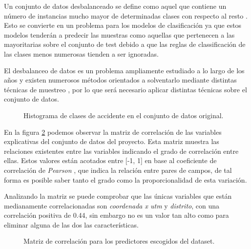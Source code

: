 \begin{enumerate}
                    Un conjunto de datos desbalanceado se define como aquel que contiene un número de instancias mucho mayor de determinadas clases con respecto al resto \cite{WhyImbalancedDataIsAProblem}. Esto se convierte en un problema para los modelos de clasificación ya que estos modelos tenderán a predecir las muestras como aquellas que pertenecen a las mayoritarias sobre el conjunto de test debido a que las reglas de classificación de las clases menos numerosas tienden a ser ignoradas.

                    El desbalanceo de datos es un problema ampliamente estudiado a lo largo de los años y existen numerosos métodos orientados a solventarlo mediante distintas técnicas de muestreo \cite{ImbalancedDataReview}, por lo que será necesario aplicar distintas técnicas sobre el conjunto de datos.


                    \begin{figure}[H]
                        \centering
                        
                        \caption{Histograma de clases de accidente en el conjunto de datos original.}
                        \label{OriginalDataHistogramImage}
                     \end{figure}


                    En la figura \ref{CorrelationMatrixImage} podemos observar la matriz de correlación de las variables explicativas del conjunto de datos del proyecto. Esta matriz muestra las relaciones existentes entre las variables indicando el grado de correlación entre ellas. Estos valores están acotados entre [-1, 1] en base al coeficiente de correlación de \textit{Pearson} \cite{PearsonCoefficientCorrelationMatrix}, que indica la relación entre pares de campos, de tal forma es posible saber tanto el grado como la proporcionalidad de esta variación.

                    Analizando la matriz se puede comprobar que las únicas variables que están medianamente correlacionadas son \textit{coordenada x utm} y \textit{distrito}, con una correlación positiva de 0.44, sin embargo no es un valor tan alto como para eliminar alguna de las dos las características.

                    \begin{figure}[H]
                        \centering
                        
                        \caption{Matriz de correlación para los predictores escogidos del dataset.}
                        \label{CorrelationMatrixImage}
                     \end{figure}



\end{enumerate}
